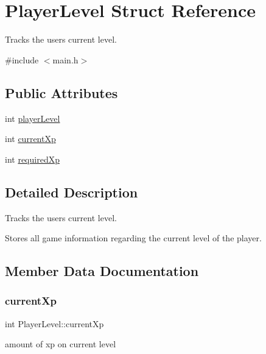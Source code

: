 \hypertarget{struct_player_level}{}\section{Player\+Level Struct Reference}
\label{struct_player_level}


Tracks the user\textquotesingle{}s current level.  




{\ttfamily \#include $<$main.\+h$>$}

\subsection*{Public Attributes}
\begin{DoxyCompactItemize}
\item 
int \hyperlink{struct_player_level_abaeb25b74813d25693446f1966c92155}{player\+Level}
\item 
int \hyperlink{struct_player_level_a9b8f1dd67cbce5b4191e0506dea61c12}{current\+Xp}
\item 
int \hyperlink{struct_player_level_aca49ddf51125224bb80fd9f9dbef376b}{required\+Xp}
\end{DoxyCompactItemize}


\subsection{Detailed Description}
Tracks the user\textquotesingle{}s current level. 

Stores all game information regarding the current level of the player. 

\subsection{Member Data Documentation}
\mbox{\label{struct_player_level_a9b8f1dd67cbce5b4191e0506dea61c12}} 
\subsubsection{\texorpdfstring{current\+Xp}{currentXp}}
{\footnotesize\ttfamily int Player\+Level\+::current\+Xp}

amount of xp on current level \mbox{\label{struct_player_level_abaeb25b74813d25693446f1966c92155}} 
